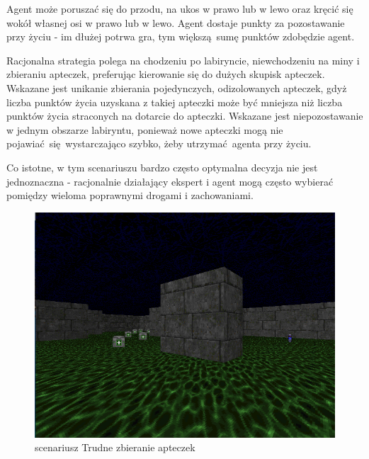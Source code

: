 Agent może poruszać się do przodu, na ukos w prawo lub w lewo oraz kręcić się wokół własnej osi w prawo lub w lewo. Agent dostaje punkty za pozostawanie przy życiu - im dłużej potrwa gra, tym większą sumę punktów zdobędzie agent.

Racjonalna strategia polega na chodzeniu po labiryncie, niewchodzeniu na miny i zbieraniu apteczek, preferując kierowanie się do dużych skupisk apteczek. Wskazane jest unikanie zbierania pojedynczych, odizolowanych apteczek, gdyż liczba punktów życia uzyskana z takiej apteczki może być mniejsza niż liczba punktów życia straconych na dotarcie do apteczki. Wskazane jest niepozostawanie w jednym obszarze labiryntu, ponieważ nowe apteczki mogą nie pojawiać się wystarczająco szybko, żeby utrzymać agenta przy życiu.

Co istotne, w tym scenariuszu bardzo często optymalna decyzja nie jest jednoznaczna - racjonalnie działający ekspert i agent mogą często wybierać pomiędzy wieloma poprawnymi drogami i zachowaniami.
\begin{center}
\begin{figure}[H]
\includegraphics[scale = 0.4]{figures/screens/scenarios/hgs.png}{\caption{scenariusz Trudne zbieranie apteczek}\label{fig:scenario_hgs}}
\end{figure}
\end{center}
